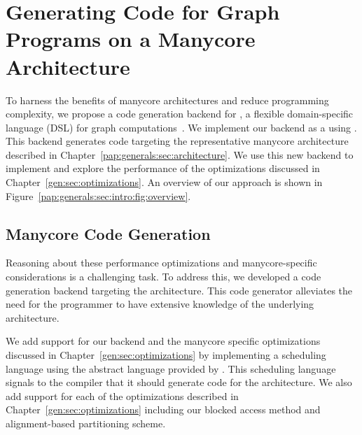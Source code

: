 \chapter{Generating Code for Graph Programs on a Manycore Architecture}\label{gen:sec:graphitbackend}
%

To harness the benefits of manycore architectures and reduce programming complexity, we propose a code generation backend for \graphit, a flexible domain-specific language (DSL) for graph computations~\cite{zhang2018graphit}. 
We implement our backend as a \graphvm using \ugc.
This backend generates code targeting the representative manycore architecture described in Chapter~\ref{pap:generals:sec:architecture}.
We use this new backend to implement and explore the performance of the optimizations discussed in Chapter~\ref{gen:sec:optimizations}.
An overview of our approach is shown in Figure~\ref{pap:generals:sec:intro:fig:overview}.

\introOverviewFigure

\section{Manycore Code Generation}\label{sec:method:sub:baseline}

Reasoning about these performance optimizations and manycore-specific considerations is a challenging task.
To address this, we developed a code generation backend targeting the \hbmc architecture.
This code generator alleviates the need for the programmer to have extensive knowledge of the underlying architecture.

We add support for our backend and the manycore specific optimizations discussed in Chapter~\ref{gen:sec:optimizations} by implementing a \hb scheduling language using the abstract language provided by \GG.
This scheduling language signals to the \graphit compiler that it should generate code for the \hbmc architecture.
We also add support for each of the optimizations described in Chapter~\ref{gen:sec:optimizations} including our blocked access method and alignment-based partitioning scheme.

